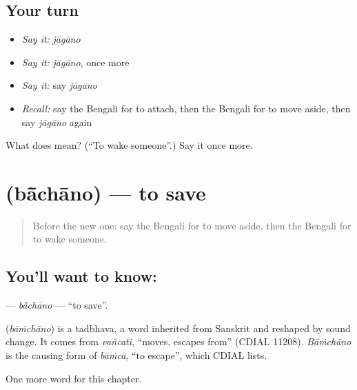 \subsection*{Your turn}
\begin{itemize}
\raggedright
  \item \emph{Say it:} \emph{jāgāno}
  \item \emph{Say it:} \emph{jāgāno}, once more
  \item \emph{Say it:} say \emph{jāgāno}
  \item \emph{Recall:} say the Bengali for to attach, then the Bengali for to move aside, then say \emph{jāgāno} again
\end{itemize}

\begin{tcolorbox}[breakable,colback=teal!4,colframe=teal!35!black,title={Before you move on}]
What does  mean? (\textquotedblleft{}To wake someone\textquotedblright{}.) Say it once more.
\end{tcolorbox}
\section[\texorpdfstring{\bn{বাঁচানো} (bā̃chāno)}{বাঁচানো (bā̃chāno)}]{ (bā̃chāno) — to save}

\label{lesson:BN-C102-bachano}



\begin{quote}
Before the new one: say the Bengali for to move aside, then the Bengali for to wake someone.
\end{quote}

\subsection*{You'll want to know: }
\textbf{} — \emph{bā̃chāno} — \textquotedblleft{}to save\textquotedblright{}.

\begin{cousinweb}
\textbf{} (\emph{bāṁchāno}) is a tadbhava, a word inherited from Sanskrit and reshaped by sound change. It comes from \emph{vañcati}, \textquotedblleft{}moves, escapes from\textquotedblright{} (CDIAL 11208). \emph{Bāṁchāno} is the causing form of \emph{bāṁcā}, \textquotedblleft{}to escape\textquotedblright{}, which CDIAL lists.
\end{cousinweb}

\begin{grammarlens}[title={What you've built}]
One more word for this chapter.
\end{grammarlens}

